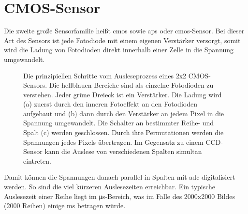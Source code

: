 \section{CMOS-Sensor}
Die zweite große Sensorfamilie heißt \gls{cmos} sowie \gls{aps} oder \gls{cmos}-Sensor. Bei dieser Art des Sensors ist jede Fotodiode mit einem eigenen Verstärker versorgt, somit wird die Ladung von Fotodioden direkt innerhalb einer Zelle in die Spannung umgewandelt. 
\begin{figure}[H]
    \centering
    \hfill
    \hfill
    \caption{Die prinzipiellen Schritte vom Ausleseprozess eines 2x2 CMOS-Sensors. Die hellblauen Bereiche sind als einzelne Fotodioden zu verstehen. Jeder grüne Dreieck ist ein Verstärker. Die Ladung wird (a) zuerst durch den inneren Fotoeffekt an den Fotodioden aufgebaut und (b) dann durch den Verstärker an jedem Pixel in die Spannung umgewandelt. Die Schalter an bestimmter Reihe- und Spalt (c) werden geschlossen. Durch ihre Permutationen werden die Spannungen jedes Pixels übertragen. Im Gegensatz zu einem CCD-Sensor kann die Auslese von verschiedenen Spalten simultan eintreten.}
    \label{fig:cmos_scheme}
\end{figure}
\noindent
Damit können die Spannungen danach parallel in Spalten mit \gls{adc} digitalisiert werden. So sind die viel kürzeren Auslesezeiten erreichbar. Ein typische Auslesezeit einer Reihe liegt im \si{\micro\second}-Bereich, was im Falle des 2000x2000 Bildes (2000 Reihen) einige \si{\milli\second} betragen würde.

